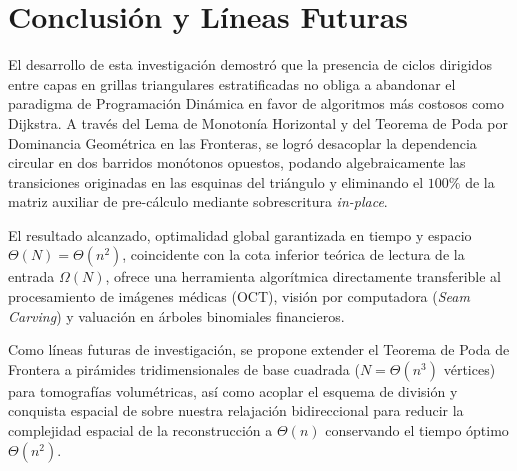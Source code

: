 \section{Conclusión y Líneas Futuras}

El desarrollo de esta investigación demostró que la presencia de ciclos dirigidos entre capas en grillas triangulares estratificadas no obliga a abandonar el paradigma de Programación Dinámica en favor de algoritmos más costosos como Dijkstra. A través del Lema de Monotonía Horizontal y del Teorema de Poda por Dominancia Geométrica en las Fronteras, se logró desacoplar la dependencia circular en dos barridos monótonos opuestos, podando algebraicamente las transiciones originadas en las esquinas del triángulo y eliminando el $100\%$ de la matriz auxiliar de pre-cálculo mediante sobrescritura \textit{in-place}.

El resultado alcanzado, optimalidad global garantizada en tiempo y espacio $\Theta(N) = \Theta(n^2)$, coincidente con la cota inferior teórica de lectura de la entrada $\Omega(N)$, ofrece una herramienta algorítmica directamente transferible al procesamiento de imágenes médicas (OCT), visión por computadora (\textit{Seam Carving}) y valuación en árboles binomiales financieros.

Como líneas futuras de investigación, se propone extender el Teorema de Poda de Frontera a pirámides tridimensionales de base cuadrada ($N = \Theta(n^3)$ vértices) para tomografías volumétricas, así como acoplar el esquema de división y conquista espacial de \textcite{hirschberg1975} sobre nuestra relajación bidireccional para reducir la complejidad espacial de la reconstrucción a $\Theta(n)$ conservando el tiempo óptimo $\Theta(n^2)$.

